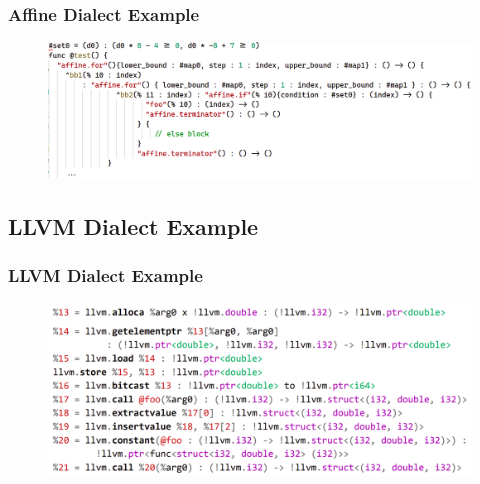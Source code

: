 \documentclass{beamer}
\begin{document}
\begin{frame}
  \frametitle{Affine Dialect Example}
  \begin{figure}[h]
    \centering
    \includegraphics[width=\textwidth]{pictures/affine1.png}
  \end{figure}
\end{frame}

\subsection{LLVM Dialect Example}
\begin{frame}
  \frametitle{LLVM Dialect Example}
  \begin{figure}[h]
    \centering    
    \includegraphics[width=\textwidth]{pictures/llvmdialect.png}
  \end{figure}
\end{frame}
\end{document}
